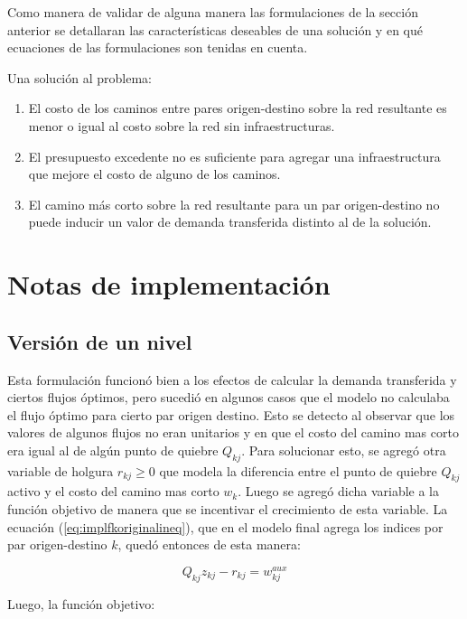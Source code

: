 \documentclass{article}
\begin{document}
  Como manera de validar de alguna manera las formulaciones de la sección anterior se detallaran las características deseables de una solución y en qué ecuaciones de las formulaciones son tenidas en cuenta.

  Una solución al problema:

  \begin{enumerate}
    \item{El costo de los caminos entre pares origen-destino sobre la red resultante es menor o igual al costo sobre la red sin infraestructuras.}
    \item{\label{budgetexcess} El presupuesto excedente no es suficiente para agregar una infraestructura que mejore el costo de alguno de los caminos.}
    \item{El camino más corto sobre la red resultante para un par origen-destino no puede inducir un valor de demanda transferida distinto al de la solución.}
  \end{enumerate}

  \section*{Notas de implementación}

  \subsection*{Versión de un nivel}

  Esta formulación funcionó bien a los efectos de calcular la demanda transferida y ciertos flujos óptimos, pero sucedió en algunos casos que el modelo no calculaba el flujo óptimo para cierto par origen destino. Esto se detecto al observar que los valores de algunos flujos no eran unitarios y en que el costo del camino mas corto era igual al de algún punto de quiebre $Q_{kj}$. Para solucionar esto, se agregó otra variable de holgura $r_{kj} \geq 0$ que modela la diferencia entre el punto de quiebre $Q_{kj}$ activo y el costo del camino mas corto $w_k$. Luego se agregó dicha variable a la función objetivo de manera que se incentivar el crecimiento de esta variable. La ecuación (\ref{eq:implfkoriginalineq}), que en el modelo final agrega los indices por par origen-destino $k$, quedó entonces de esta manera:

  \begin{equation}
    Q_{kj} z_{kj} - r_{kj} = w^{aux}_{kj}
  \end{equation}

  Luego, la función objetivo:
\end{document}
